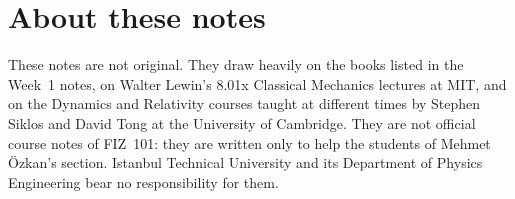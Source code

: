 \documentclass[11pt,a4paper]{article}
\begin{document}
\section*{About these notes}
These notes are not original. They draw heavily on the books listed in the Week~1 notes, on Walter Lewin's 8.01x Classical Mechanics lectures at MIT, and on the Dynamics and Relativity courses taught at different times by Stephen Siklos and David Tong at the University of Cambridge. They are not official course notes of FIZ~101: they are written only to help the students of Mehmet \"Ozkan's section. Istanbul Technical University and its Department of Physics Engineering bear no responsibility for them.
\end{document}
